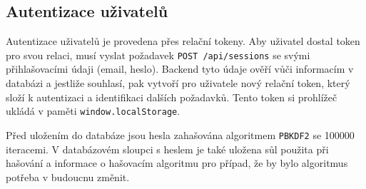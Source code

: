 \subsection{Autentizace uživatelů}

Autentizace uživatelů je provedena přes relační tokeny. Aby uživatel dostal token pro svou relaci,
musí vyslat požadavek \texttt{POST /api/sessions} se svými přihlašovacími údaji (email, heslo).
Backend tyto údaje ověří vůči informacím v databázi a jestliže souhlasí, pak vytvoří pro uživatele
nový relační token, který složí k autentizaci a identifikaci dalších požadavků. Tento token si
prohlížeč ukládá v paměti \texttt{window.localStorage}.

Před uložením do databáze jsou hesla zahašována algoritmem \texttt{PBKDF2} se \num{100 000} iteracemi. V
databázovém sloupci s heslem je také uložena sůl použita při hašování a informace o hašovacím
algoritmu pro případ, že by bylo algoritmus potřeba v budoucnu změnit.
